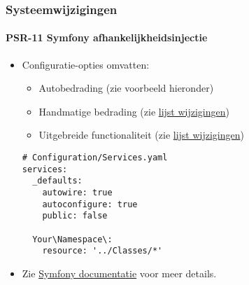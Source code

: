 
\begin{frame}[fragile]
	\frametitle{Systeemwijzigingen}
	\framesubtitle{PSR-11 Symfony afhankelijkheidsinjectie}

	\lstset{basicstyle=\tiny\ttfamily}

	\begin{itemize}
		\item Configuratie-opties omvatten:

			\begin{itemize}
				\item Autobedrading (zie voorbeeld hieronder)
				\item Handmatige bedrading
					(zie \href{https://docs.typo3.org/c/typo3/cms-core/master/en-us/Changelog/10.0/Feature-84112-SymfonyDependencyInjectionForCoreAndExtbase.html}{lijst wijzigingen})
				\item Uitgebreide functionaliteit
					(zie \href{https://docs.typo3.org/c/typo3/cms-core/master/en-us/Changelog/10.0/Feature-84112-SymfonyDependencyInjectionForCoreAndExtbase.html}{lijst wijzigingen})
			\end{itemize}
\begin{lstlisting}
# Configuration/Services.yaml
services:
  _defaults:
    autowire: true
    autoconfigure: true
    public: false

  Your\Namespace\:
    resource: '../Classes/*'
\end{lstlisting}

		\item Zie \href{https://symfony.com/doc/current/service_container.html}{Symfony documentatie} voor meer details.

	\end{itemize}

\end{frame}


